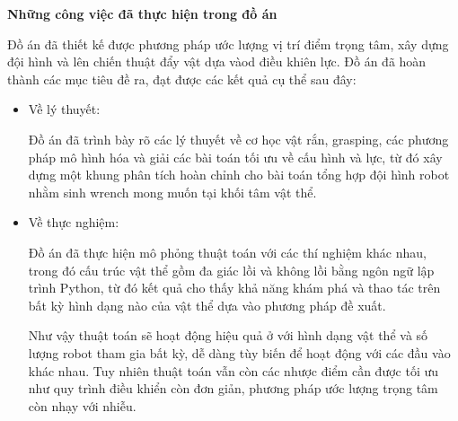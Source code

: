 \textbf{Những công việc đã thực hiện trong đồ án}


Đồ án đã thiết kế được phương pháp ước lượng vị trí điểm trọng tâm, xây dựng đội hình và lên chiến thuật đẩy vật dựa vàod điều khiên lực.  Đồ án đã hoàn thành các mục tiêu đề ra, đạt được các kết quả cụ thể sau đây:
\begin{itemize}
    \item Về lý thuyết:
    
    Đồ án đã trình bày rõ các lý thuyết về cơ học vật rắn, grasping, các phương pháp mô hình hóa và giải các bài toán tối ưu về cấu hình và lực, từ đó xây dựng một khung phân tích hoàn chỉnh cho bài toán tổng hợp đội hình robot nhằm sinh wrench mong muốn tại khối tâm vật thể.
    
    \item Về thực nghiệm:
    
    Đồ án đã thực hiện mô phỏng thuật toán với các thí nghiệm khác nhau, trong đó cấu trúc vật thể gồm đa giác lồi và không lồi bằng ngôn ngữ lập trình Python, từ đó kết quả cho thấy khả năng khám phá và thao tác trên bất kỳ hình dạng nào của vật thể dựa vào phương pháp đề xuất.
    
    Như vậy thuật toán sẽ hoạt động hiệu quả ở với hình dạng vật thể và số lượng robot tham gia bất kỳ, dễ dàng tùy biến để hoạt động với các đầu vào khác nhau. Tuy nhiên thuật toán vẫn còn các nhược điểm cần được tối ưu như quy trình điều khiển còn đơn giản, phương pháp ước lượng trọng tâm còn nhạy với nhiễu.   
\end{itemize}
    





